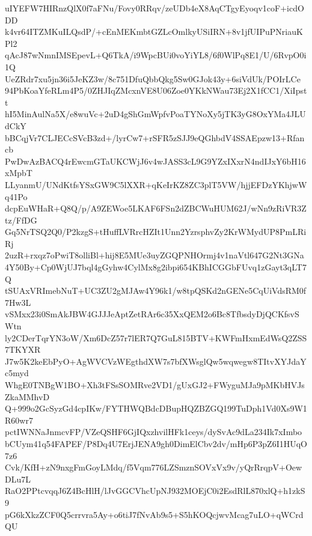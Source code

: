 uIYEFW7HIRnzQlX0f7aFNu/Fovy0RRqv/zeUDb4eX8AqCTgyEyoqv1coF+icdODD
k4vr64ITZMKuILQsdP/+cEnMEKmbtGZLcOmlkyUSiIRN+8v1jfUIPuPNriauKPl2
qAcJ87wNmnIMSEpevL+Q6TkA/i9WpcBUi0voYiYL8/6f0WlPq8E1/U/6RvpO0i1Q
UeZRdr7xu5jn36i5JeKZ3w/8c751DfuQbbQkg5Sw0GJok43y+6siVdUk/POIrLCe
94PbKoaYfeRLm4P5/0ZHJIqZMcxnVE8U06Zoe0YKkNWau73Ej2X1fCC1/XiIpstt
hI5MinAulNa5X/e8wuVc+2uD4gShGmWpfvPoaTYNoXy5jTK3yG8OxYMa4JLUdCkY
bBCqjVr7CLJECcSVcB3zd+/lyrCw7+rSFR5zSJJ9eQGhbdV4SSAEpzw13+Rfancb
PwDwAzBACQ4rEwcmGTaUKCWjJ6v4wJASS3cL9G9YZxIXxrN4ndIJxY6bH16xMpbT
LLyanmU/UNdKtfsYSxGW9C5lXXR+qKeIrKZ8ZC3plT5VW/hjjEFDzYKhjwWq41Po
dcpEuWHaR+Q8Q/p/A9ZEWoe5LKAF6FSn2dZBCWuHUM62J/wNn9zRiVR3Ztz/FfDG
Gq5NrTSQ2Q0/P2kzgS+tHuffLVRrcHZIt1Unn2YzrsphvZy2KrWMydUP8PmLRiRj
2uzR+rxqz7oPwiT8olliBl+hij8E5MUe3uyZGQPNHOrmj4v1naVtl647G2Nt3GNa
4Y50By+Cp0WjUJ7bql4gGyhw4CylMx8g2ibpi654KBhICGGbFUvq1zGayt3qLT7Q
tSUAxVRImebNuT+UC3ZU2gMJAw4Y96k1/w8tpQSKd2nGENe5CqUiVdsRM0f7Hw3L
vSMxx23i0SmAkJBW4GJJJeAptZetRAr6c35XxQEM2o6Bc8TfbsdyDjQCKfsvSWtn
ly2CDerTqrYN3oW/Xm6DcZ57r7lER7Q7GuL815BTV+KWFmHxmEdWsQ2ZSS7TKYXR
J7w5K2keEbPyO+AgWVCVzWEgthdXW7s7bfXWsglQw5wqwegw8TItvXYJdaYc5myd
WhgE0TNBgW1BO+Xh3tFSsSOMRve2VD1/gUxGJ2+FWyguMJa9pMKbHVJsZkaMMhvD
Q+999o2GcSyzGd4cpIKw/FYTHWQBdcDBupHQZBZGQ199TuDph1Vd0Xs9W1R60wr7
pctIWNNaJnmcvFP/VZeQSHF6GjIQxzhvilHFk1ceys/dySvAc9dLa234Ik7xImbo
bCUym41q54FAPEF/P8Dq4U7ErjJENA9gh0DimElCbv2dv/mHp6P3pZ6I1HUqO7z6
Cvk/KfH+zN9nxgFmGoyLMdq/f5Vqm776LZSmznSOVxVx9v/yQrRrqpV+OewDLu7L
RaO2PPtcvqqJ6Z4BcHlH/lJvGGCVhcUpNJ932MOEjC0i2EsdRlL870xlQ+h1zkS9
pG6kXkzZCF0Q5crrvra5Ay+o6tiJ7fNvAb9s5+S5hKOQcjwvMcag7uLO+qWCrdQU
